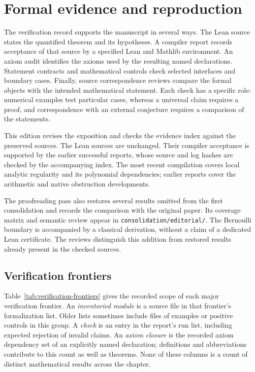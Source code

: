 \section{Formal evidence and reproduction}
\label{sec:verification}

The verification record supports the manuscript in several ways. The Lean source states the quantified theorem and its hypotheses. A
compiler report records acceptance of that source by a specified Lean and
Mathlib environment. An axiom audit identifies the axioms used by the resulting
named declarations. Statement contracts and mathematical controls check
selected interfaces and boundary cases. Finally, source correspondence reviews
compare the formal objects with the intended mathematical statement. Each check has a specific role: numerical examples test particular cases,
whereas a universal claim requires a proof, and correspondence with an
external conjecture requires a comparison of the statements.

This edition revises the exposition and checks the evidence index against
the preserved sources. The Lean sources are unchanged. Their compiler
acceptance is supported by the earlier successful reports, whose source and
log hashes are checked by the accompanying index. The most recent compilation
covers local analytic regularity and its polynomial dependencies; earlier
reports cover the arithmetic and native obstruction developments.

The proofreading pass also restores several results omitted from the first
consolidation and records the comparison with the original paper. Its
coverage matrix and semantic review appear in
\texttt{consolidation/editorial/}. The Bernoulli boundary is accompanied by
a classical derivation, without a claim of a dedicated Lean certificate.
The reviews distinguish this addition from restored results already present
in the checked sources.

\subsection{Verification frontiers}

Table~\ref{tab:verification-frontiers} gives the recorded scope of each major
verification frontier. An \emph{inventoried module} is a source file in that
frontier's formalization list. Older lists sometimes include files of examples
or positive controls in this group. A \emph{check} is an entry in the report's
run list, including expected rejection of invalid claims. An \emph{axiom
closure} is the recorded axiom dependency set of an explicitly named
declaration; definitions and abbreviations contribute to this count as well
as theorems. None of these columns is a count of distinct mathematical results
across the chapter.


